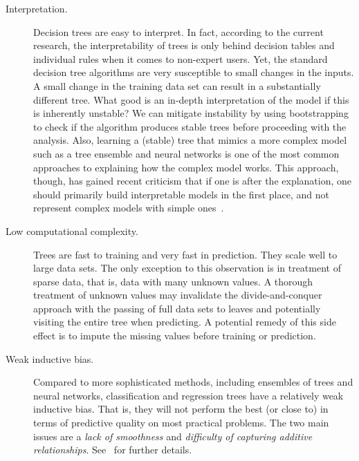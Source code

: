 \begin{refsection}
\begin{description}
\item[Interpretation.] Decision trees are easy to interpret. In fact, according to the current research, the interpretability of trees is only behind decision tables and individual rules when it comes to non-expert users. Yet, the standard decision tree algorithms are very susceptible to small changes in the inputs. A small change in the training data set can result in a substantially different tree. What good is an in-depth interpretation of the model if this is inherently unstable? We can mitigate instability by using bootstrapping to check if the algorithm produces stable trees before proceeding with the analysis. Also, learning a (stable) tree that mimics a more complex model such as a tree ensemble and neural networks is one of the most common approaches to explaining how the complex model works. This approach, though, has gained recent criticism that if one is after the explanation, one should primarily build interpretable models in the first place, and not represent complex models with simple ones~\citep{Rudin2019}.

\item[Low computational complexity.] Trees are fast to training and very fast in prediction. They scale well to large data sets. The only exception to this observation is in treatment of sparse data, that is, data with many unknown values. A thorough treatment of unknown values may invalidate the divide-and-conquer approach with the passing of full data sets to leaves and potentially visiting the entire tree when predicting. A potential remedy of this side effect is to impute the missing values before training or prediction.

\item[Weak inductive bias.] Compared to more sophisticated methods, including ensembles of trees and neural networks, classification and regression trees have a relatively weak inductive bias. That is, they will not perform the best (or close to) in terms of predictive quality on most practical problems. The two main issues are a {\em lack of smoothness} and {\em difficulty of capturing additive relationships}. See~\citep{ESL} for further details.


\end{description}
\end{refsection}
